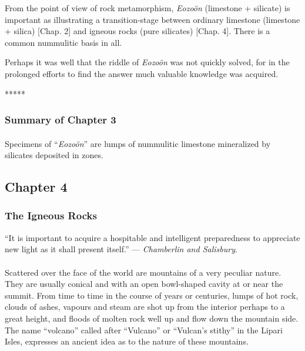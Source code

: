 \documentclass[a4paper, 12pt, oneside, landscape]{article}
\begin{document}
From the point of view of rock metamorphism, \emph{Eozoön} (limestone + silicate) is important as illustrating a transition-stage between ordinary limestone (limestone + silica) [Chap. 2] and igneous rocks (pure silicates) [Chap. 4]. There is a common nummulitic basis in all.

Perhaps it was well that the riddle of \emph{Eozoön} was not quickly solved, for in the prolonged efforts to find the answer much valuable knowledge was acquired.

\centerline{*\hspace{15mm}*\hspace{15mm}*\hspace{15mm}*\hspace{15mm}*}
\bigskip

\subsubsection{Summary of Chapter 3}
\paragraph{}
Specimens of ``\emph{Eozoön}'' are lumps of nummulitic limestone mineralized by silicates deposited in zones.
\clearpage
\subsection{Chapter 4}
\subsubsection{The Igneous Rocks}
\begin{displayquote}
``It is important to acquire a hospitable and intelligent preparedness to appreciate new light as it shall present itself.'' --- \emph{Chamberlin and Salisbury}.
\end{displayquote}
\paragraph{}
Scattered over the face of the world are mountains of a very peculiar nature. They are usually conical and with an open bowl-shaped cavity at or near the summit. From time to time in the course of years or centuries, lumps of hot rock, clouds of ashes, vapours and steam are shot up from the interior perhaps to a great height, and floods of molten rock well up and flow down the mountain side. The name ``volcano'' called after ``Vulcano'' or ``Vulcan's stithy'' in the Lipari Isles, expresses an ancient idea as to the nature of these mountains.
\end{document}
